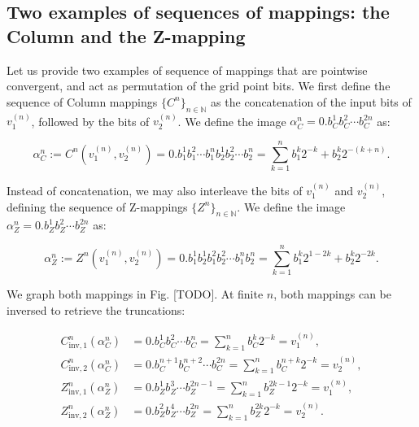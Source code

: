 \documentclass[10pt,letterpaper]{article}
\begin{document}
\subsection{Two examples of sequences of mappings: the Column and the Z-mapping} \label{sec:mapping-examples}

Let us provide two examples of sequence of mappings that are pointwise convergent, and act as permutation of the grid point bits.
We first define the sequence of Column mappings $\{C^n\}_{n\in\mathbb N}$ as the concatenation of the input bits of $v_1^{(n)}$, followed by the bits of $v_2^{(n)}$. We define the image $\alpha_C^n = 0.b_C^1 b_C^2 \cdots b_C^{2n}$ as:

\begin{equation} \label{eq:def-column-mapping}
\alpha_C^n := C^n(v_1^{(n)}, v_2^{(n)}) = 0.b_1^1 b_1^2 \cdots b_1^n b_2^1 b_2^2 \cdots b_2^n = \sum_{k=1}^n b_1^k 2^{-k} + b_2^k 2^{-(k+n)}.
\end{equation}

Instead of concatenation, we may also interleave the bits of $v_1^{(n)}$ and $v_2^{(n)}$, defining the sequence of Z-mappings $\{Z^n\}_{n\in\mathbb N}$. We define the image $\alpha_Z^n = 0.b_Z^1 b_Z^2 \cdots b_Z^{2n}$ as:

\begin{equation} \label{eq:def-z-mapping}
\alpha_Z^n := Z^n(v_1^{(n)}, v_2^{(n)}) = 0.b_1^1 b_2^1 b_1^2 b_2^2 \cdots b_1^n b_2^n = \sum_{k=1}^n b_1^k 2^{1-2k} + b_2^k 2^{-2k}.
\end{equation}

We graph both mappings in Fig. [TODO]. At finite $n$, both mappings can be inversed to retrieve the truncations:

\begin{equation} \begin{aligned}
C^n_{\textrm{inv},1}(\alpha_C^n) &= 0.b_C^1 b_C^2 \cdots b_C^n = \sum_{k=1}^n b_C^k 2^{-k} = v_1^{(n)}, \\
C^n_{\textrm{inv},2}(\alpha_C^n) &= 0.b_C^{n+1} b_C^{n+2} \cdots b_C^{2n} = \sum_{k=1}^n b_C^{n+k} 2^{-k} = v_2^{(n)}, \\
Z^n_{\textrm{inv},1}(\alpha_Z^n) &= 0.b_Z^1 b_Z^3 \cdots b_Z^{2n-1} = \sum_{k=1}^n b_Z^{2k-1} 2^{-k} = v_1^{(n)},\\
Z^n_{\textrm{inv},2}(\alpha_Z^n) &= 0.b_Z^2 b_Z^4 \cdots b_Z^{2n} = \sum_{k=1}^n b_Z^{2k} 2^{-k} = v_2^{(n)}.
\end{aligned} \end{equation}
\end{document}
